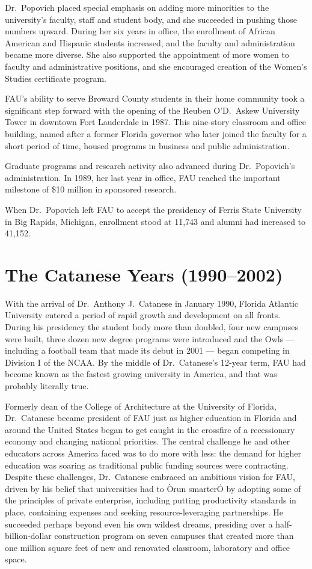 \documentclass[phd, 12pt, print]{fauthesis}
\begin{document}
Dr.\ Popovich placed special emphasis on adding more minorities to the university's faculty, staff and student body, and she succeeded in pushing those numbers upward. During her six years in office, the enrollment of African American and Hispanic students increased, and the faculty and administration became more diverse. She also supported the appointment of more women to faculty and administrative positions, and she encouraged creation of the Women's Studies certificate program.

FAU's ability to serve Broward County students in their home community took a significant step forward with the opening of the Reuben O'D.\ Askew University Tower in downtown Fort Lauderdale in 1987.  This nine-story classroom and office building, named after a former Florida governor who later joined the faculty for a short period of time, housed programs in business and public administration.

Graduate programs and research activity also advanced during Dr.\ Popovich's administration.  In 1989, her last year in office, FAU reached the important milestone of \$10 million in sponsored research.

When Dr.\ Popovich left FAU to accept the presidency of Ferris State University in Big Rapids, Michigan, enrollment stood at 11,743 and alumni had increased to 41,152.

\section{The Catanese Years (1990--2002)}

With the arrival of Dr.\ Anthony J.\ Catanese in January 1990, Florida Atlantic University entered a period of rapid growth and development on all fronts.  During his presidency the student body more than doubled, four new campuses were built, three dozen new degree programs were introduced and the Owls  ---  including a football team that made its debut in 2001  ---  began competing in Division I of the NCAA.  By the middle of Dr.\ Catanese's 12-year term, FAU had become known as the fastest growing university in America, and that was probably literally true.

Formerly dean of the College of Architecture at the University of Florida, Dr.\ Catanese became president of FAU just as higher education in Florida and around the United States began to get caught in the crossfire of a recessionary economy and changing national priorities.  The central challenge he and other educators across America faced was to do more with less: the demand for higher education was soaring as traditional public funding sources were contracting.  Despite these challenges, Dr.\ Catanese embraced an ambitious vision for FAU, driven by his belief that universities had to Òrun smarterÓ by adopting some of the principles of private enterprise, including putting productivity standards in place, containing expenses and seeking resource-leveraging partnerships.  He succeeded perhaps beyond even his own wildest dreams, presiding over a half-billion-dollar construction program on seven campuses that created more than one million square feet of new and renovated classroom, laboratory and office space.
\end{document}
